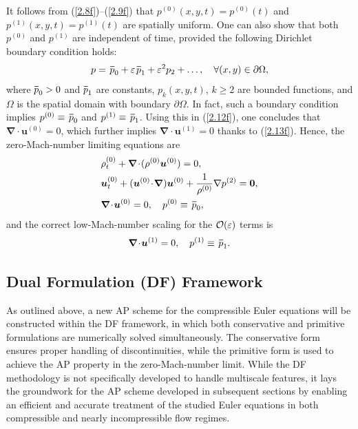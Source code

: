 \documentclass[A4paper,12pt,twoside]{article}
\numberwithin{equation}{section}
\numberwithin{figure}{section}
\numberwithin{table}{section}
\def\bnabla{\bm{\nabla}}
\newcommand{\ve}{\varepsilon}
\newcommand\eref[1]{(\ref{#1})}
\newcommand*\xbar[1]{%
  \hbox{%
    \vbox{%
      \hrule height 0.5pt %
      \kern0.4ex%
      \hbox{%
        \kern-0.05em%
        \ensuremath{#1}%
        \kern-0.00em%
      }%
    }%
  }%
}
\begin{document}
It follows from \eref{2.8f}--\eref{2.9f} that $p^{(0)}(x,y,t)=p^{(0)}(t)$ and $p^{(1)}(x,y,t)=p^{(1)}(t)$ are spatially uniform. One can
also show that both $p^{(0)}$ and $p^{(1)}$ are independent of time, provided the following Dirichlet boundary condition holds:
\begin{equation}
p=\,\xbar p_0+\ve\,\xbar p_1+\ve^2 p_2+\dots,\quad\forall(x,y)\in\partial\Omega,
\label{3.2}			
\end{equation}
where $\xbar p_0>0$ and $\xbar p_1$ are constants, $p_k(x,y,t)$, $k\ge2$ are bounded functions, and $\Omega$ is the spatial domain with
boundary $\partial\Omega$. In fact, such a boundary condition implies $p^{(0)}\equiv\,\xbar p_0$ and $p^{(1)}\equiv\,\xbar p_1$. Using this
in \eref{2.12f}, one concludes that $\bnabla\!\cdot\!\bm u^{(0)}=0$, which further implies $\bnabla\!\cdot\!\bm u^{(1)}=0$ thanks to
\eref{2.13f}. Hence, the zero-Mach-number limiting equations are
\begin{align}
&\rho^{(0)}_t+\bnabla\!\cdot\!(\rho^{(0)}\bm u^{(0)})=0,\label{3.3}\\
&\bm u^{(0)}_t+(\bm u^{(0)}\!\cdot\!\bnabla)\bm u^{(0)}+\frac{1}{\rho^{(0)}}\nabla p^{(2)}=\bm0,\label{3.4}\\
&\bnabla\!\cdot\!\bm u^{(0)}=0,\quad p^{(0)}\equiv\,\xbar p_0,\label{3.5}
\end{align}
and the correct low-Mach-number scaling for the ${\cal O}(\ve)$ terms is
\begin{equation}
\bnabla\!\cdot\!\bm u^{(1)}=0,\quad p^{(1)}\equiv\,\xbar p_1.
\label{3.6}
\end{equation}

\subsection{Dual Formulation (DF) Framework}\label{sec4a}
As outlined above, a new AP scheme for the compressible Euler equations will be constructed within the DF framework, in which both
conservative and primitive formulations are numerically solved simultaneously. The conservative form ensures proper handling of
discontinuities, while the primitive form is used to achieve the AP property in the zero-Mach-number limit. While the DF methodology is not
specifically developed to handle multiscale features, it lays the groundwork for the AP scheme developed in subsequent sections by enabling
an efficient and accurate treatment of the studied Euler equations in both compressible and nearly incompressible flow regimes.
\end{document}
